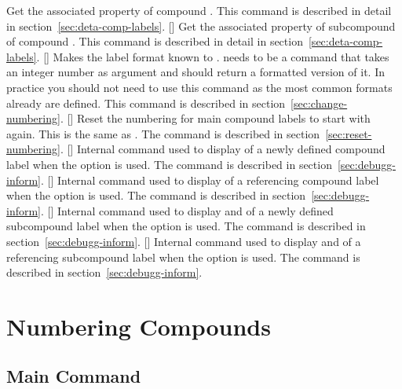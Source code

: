 \documentclass[load-preamble+,babel-options={ngerman,british,american}]{cnltx-doc}
\begin{document}
\begin{commands}
    Get the associated property  of compound
    . This command is described in detail in
    section~\ref{sec:deta-comp-labels}.
  \expandable{}[]
    Get the associated property  of subcompound  of compound .  This command is described
    in detail in section~\ref{sec:deta-comp-labels}.
  []
    Makes the label format  known to \chemnum.  
    needs to be a command that takes an integer number as argument and should
    return a formatted version of it.  In practice you should not need to use
    this command as the most common formats already are defined.  This command
    is described in section~\ref{sec:change-numbering}.
  []
    Reset the numbering for main compound labels to start with 
    again.  This is the same as
    .  The
    command is described in section~\ref{sec:reset-numbering}.
  []
    Internal command used to display  of a newly defined compound
    label when the option  is used.  The command is
    described in section~\ref{sec:debugg-inform}.
  []
    Internal command used to display  of a referencing compound
    label when the option  is used.  The command is
    described in section~\ref{sec:debugg-inform}.
  []
    Internal command used to display  and  of a newly defined subcompound label when the option
     is used.  The command is described in
    section~\ref{sec:debugg-inform}.
  []
    Internal command used to display  and  of a referencing subcompound label when the option
     is used.  The command is described in
    section~\ref{sec:debugg-inform}.
\end{commands}

\section{Numbering Compounds}\label{sec:numbering-compounds}
\subsection{Main Command}\label{sec:main-command}\resetcmpd
\end{document}
